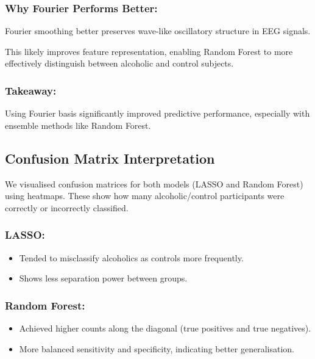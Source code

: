 \documentclass{article}
\begin{document}
\subsubsection{Why Fourier Performs
Better:}\label{why-fourier-performs-better}

Fourier smoothing better preserves wave-like oscillatory structure in
EEG signals.

This likely improves feature representation, enabling Random Forest to
more effectively distinguish between alcoholic and control subjects.

\subsubsection{Takeaway:}\label{takeaway}

Using Fourier basis significantly improved predictive performance,
especially with ensemble methods like Random Forest.

\subsection{Confusion Matrix
Interpretation}\label{confusion-matrix-interpretation}

We visualised confusion matrices for both models (LASSO and Random
Forest) using heatmaps. These show how many alcoholic/control
participants were correctly or incorrectly classified.

\subsubsection{LASSO:}\label{lasso}

\begin{itemize}
\item
  Tended to misclassify alcoholics as controls more frequently.
\item
  Shows less separation power between groups.
\end{itemize}

\subsubsection{Random Forest:}\label{random-forest-1}

\begin{itemize}
\item
  Achieved higher counts along the diagonal (true positives and true
  negatives).
\item
  More balanced sensitivity and specificity, indicating better
  generalisation.
\end{itemize}
\end{document}
